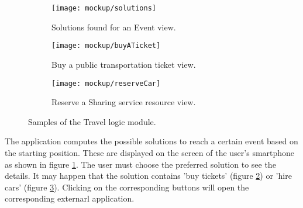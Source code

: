 
\begin{figure}[H]	
	\begin{subfigure}{0.5\linewidth}
		\centering		
		\texttt{[image: mockup/solutions]} 
		\caption{Solutions found for an Event view.}
		\label{fig:solutions}
	\end{subfigure}
	\begin{subfigure}{0.5\linewidth}
		\texttt{[image: mockup/buyATicket]} 
		\centering
		\caption{Buy a public transportation ticket view.}
		\label{fig:buyTicket}
	\end{subfigure} 
	\hfill
	
	\bigskip	
	\begin{subfigure}{\linewidth}
			\centering
		\texttt{[image: mockup/reserveCar]} 
		\caption{Reserve a Sharing service resource view.}
		\label{fig:reserveCar}
	\end{subfigure}

	\caption{Samples of the Travel logic module.}
	\label{fig:travelLogic}
\end{figure}

	The application computes the possible solutions to reach a certain event based on the starting position. These are displayed on the screen of the user's smartphone as shown in figure \ref{fig:solutions}. The user must choose the preferred solution to see the details. It may happen that the solution contains 'buy tickets' (figure \ref{fig:buyTicket}) or 'hire cars' (figure \ref{fig:reserveCar}). Clicking on the corresponding buttons will open the corresponding externarl application.
